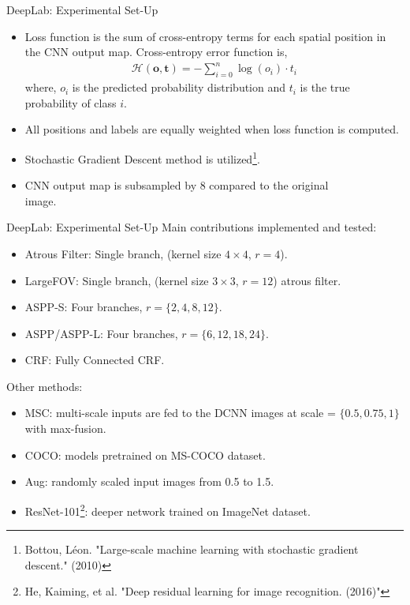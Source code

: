 \documentclass{beamer}
\begin{document}
\begin{frame}{DeepLab: Experimental Set-Up }
\begin{itemize}
	\item Loss function is the sum of cross-entropy terms for each spatial position in the CNN output map. Cross-entropy error function is,
	\begin{align*}
	\mathcal{H}(\mathbf{o},\mathbf{t})=-\sum_{i=0}^{n}\log(o_i)\cdot t_i
	\end{align*}
	where, $o_i$ is the predicted probability distribution and $t_i$ is the true probability of class $i$. 
	\item<2-> All positions and labels are equally weighted when loss function is computed.
	\item<3-> Stochastic Gradient Descent method is utilized\footnote{Bottou, Léon. "Large-scale machine learning with stochastic gradient\\ descent." (2010)}. 
	\item<4-> CNN output map is subsampled by 8 compared to the original\\ image.
\end{itemize}
\end{frame}

\begin{frame}{DeepLab: Experimental Set-Up }
Main contributions implemented and tested:
\begin{itemize}
	\item {\color{blue}Atrous Filter}: Single branch, (kernel size $4\times4$, $r=4$).	
	\item {\color{blue}LargeFOV}: Single branch, (kernel size $3\times3$, $r=12$) atrous filter.
	\item {\color{blue}ASPP-S}: Four branches, $r= \{2, 4, 8, 12\}$.
	\item {\color{blue}ASPP/ASPP-L}: Four branches, $r = \{6, 12, 18, 24\}$.
	\item {\color{blue}CRF}: Fully Connected CRF.
\end{itemize}
Other methods:
\begin{itemize}
	\item {\color{blue}MSC}: multi-scale inputs are fed to the DCNN images at scale = $\{0.5, 0.75, 1\}$ with max-fusion.
	\item {\color{blue}COCO}: models pretrained on MS-COCO dataset.
	\item {\color{blue}Aug}: randomly scaled input images from 0.5 to 1.5.
	\item {\color{blue}ResNet-101\footnote{He, Kaiming, et al. "Deep residual learning for image recognition. (2016)"}}: deeper network trained on ImageNet dataset. 
\end{itemize}
\end{frame}
\end{document}
